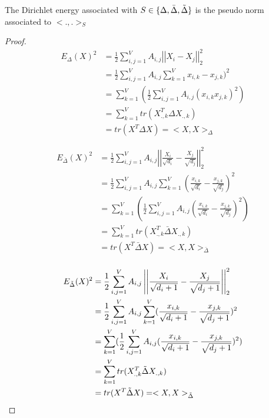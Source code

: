 \documentclass[12pt]{article}
\begin{document}
\begin{thm}
    The Dirichlet energy associated with $S \in \{\Delta, \bar{\Delta}, \Tilde{\Delta}\}$ is the pseudo norm associated to $<.,.>_{S}$
\end{thm}

\begin{proof}
    \begin{align*}
        E_{\Delta}(X)^2 &= \frac{1}{2} \sum_{i,j = 1}^V A_{i,j} \left| \left|X_i-X_j \right| \right|_2^2 \\
        &= \frac{1}{2} \sum_{i,j = 1}^V A_{i,j} \sum_{k=1}^V x_{i,k}-x_{j,k})^2 \\
        &= \sum_{k=1}^V (\frac{1}{2} \sum_{i,j = 1}^V A_{i,j} (x_{i,k}x_{j,k})^2 )\\
        &= \sum_{k=1}^V tr(X_{.,k}^T \Delta X_{.,k}) \\
        &= tr(X^T \Delta X) = <X,X>_{\Delta}\\\\
    \end{align*}
    \begin{align*}
        E_{\bar{\Delta}}(X)^2 &= \frac{1}{2} \sum_{i,j = 1}^V A_{i,j} \left| \left|\frac{X_i}{\sqrt{d_i}} -\frac{X_j}{\sqrt{d_j}}\right|\right|_2^2 \\
        &= \frac{1}{2} \sum_{i,j = 1}^V A_{i,j} \sum_{k=1}^V (\frac{x_{i,k}}{\sqrt{d_i}} -\frac{x_{j,k}}{\sqrt{d_j}})^2 \\
        &= \sum_{k=1}^V (\frac{1}{2} \sum_{i,j = 1}^V A_{i,j} (\frac{x_{i,k}}{\sqrt{d_i}} -\frac{x_{j,k}}{\sqrt{d_j}})^2 )\\
        &= \sum_{k=1}^V tr(X_{.,k}^T \bar{\Delta} X_{.,k}) \\
        &= tr(X^T \bar{\Delta} X) = <X,X>_{\bar{\Delta}}\\\\
    \end{align*}
    \begin{align*}
        E_{\Tilde{\Delta}}(X)^2 &= \frac{1}{2} \sum_{i,j = 1}^V A_{i,j} \left| \left|\frac{X_i}{\sqrt{d_i+1}} -\frac{X_j}{\sqrt{d_j+1}}\right| \right|_2^2 \\
        &= \frac{1}{2} \sum_{i,j = 1}^V A_{i,j} \sum_{k=1}^V (\frac{x_{i,k}}{\sqrt{d_i+1}} -\frac{x_{j,k}}{\sqrt{d_j+1}})^2 \\
        &= \sum_{k=1}^V (\frac{1}{2} \sum_{i,j = 1}^V A_{i,j} (\frac{x_{i,k}}{\sqrt{d_i+1}} -\frac{x_{j,k}}{\sqrt{d_j+1}})^2 )\\
        &= \sum_{k=1}^V tr(X_{.,k}^T \Tilde{\Delta} X_{.,k}) \\
        &= tr(X^T \Tilde{\Delta} X) = <X,X>_{\Tilde{\Delta}}
    \end{align*}
\end{proof}
\end{document}

